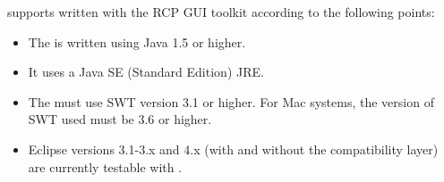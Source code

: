 \app{} supports \gdauts{} written with the RCP GUI toolkit according to the following points:


\begin{itemize}
\item The \gdaut{} is written using Java 1.5 or higher. 
\item It uses a Java SE (Standard Edition) JRE.
\item The \gdaut{} must use SWT version 3.1 or higher. For Mac systems, the version of SWT used must be 3.6 or higher. 
\item Eclipse versions 3.1-3.x and 4.x (with and without the compatibility layer) are currently testable with \app{}.
\end{itemize}
